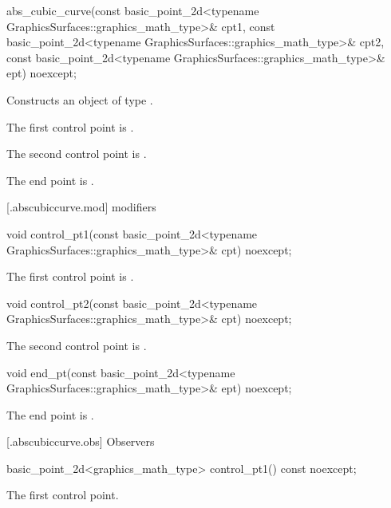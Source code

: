 %
\begin{itemdecl}
abs_cubic_curve(const basic_point_2d<typename GraphicsSurfaces::graphics_math_type>& cpt1,
  const basic_point_2d<typename GraphicsSurfaces::graphics_math_type>& cpt2,
  const basic_point_2d<typename GraphicsSurfaces::graphics_math_type>& ept) noexcept;
\end{itemdecl}
\begin{itemdescr}
\pnum
\effects Constructs an object of type .

\pnum
\remarks The first control point is .

\pnum
\remarks The second control point is .

\pnum
\remarks The end point is .
\end{itemdescr}

 [\iotwod.abscubiccurve.mod]{ modifiers}

%
\begin{itemdecl}
void control_pt1(const basic_point_2d<typename
  GraphicsSurfaces::graphics_math_type>& cpt) noexcept;
\end{itemdecl}
\begin{itemdescr}
\pnum
\effects
The first control point is .
\end{itemdescr}

%
\begin{itemdecl}
void control_pt2(const basic_point_2d<typename
  GraphicsSurfaces::graphics_math_type>& cpt) noexcept;
\end{itemdecl}
\begin{itemdescr}
\pnum
\effects
The second control point is .
\end{itemdescr}

%
\begin{itemdecl}
void end_pt(const basic_point_2d<typename GraphicsSurfaces::graphics_math_type>& ept) noexcept;
\end{itemdecl}
\begin{itemdescr}
\pnum
\effects
The end point is .
\end{itemdescr}

 [\iotwod.abscubiccurve.obs] {Observers}

%
\begin{itemdecl}
basic_point_2d<graphics_math_type> control_pt1() const noexcept;
\end{itemdecl}
\begin{itemdescr}
\pnum
\returns The first control point.
\end{itemdescr}

